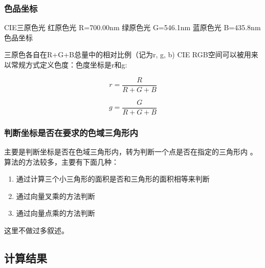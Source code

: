 \documentclass[UTF8]{article}
\begin{document}
\subsubsection{色品坐标}
CIE三原色光
红原色光    R=700.00nm
绿原色光    G=546.1nm
蓝原色光    B=435.8nm
色品坐标


三原色各自在R+G+B总量中的相对比例（记为r, g, b)
CIE RGB空间可以被用来以常规方式定义色度：色度坐标是r和g:


\begin{equation}
r= \frac{R}{R+G+B}
\end{equation}

\begin{equation}
g= \frac{G}{R+G+B}
\end{equation}

\subsubsection{判断坐标是否在要求的色域三角形内}
主要是判断坐标是否在色域三角形内，转为判断一个点是否在指定的三角形内
。算法的方法较多，主要有下面几种：
\begin{enumerate}
\item  通过计算三个小三角形的面积是否和三角形的面积相等来判断
\item  通过向量叉乘的方法判断
\item  通过向量点乘的方法判断
\end{enumerate}

这里不做过多叙述。

\subsection{计算结果}

\lstset{numbers=none,
  numberstyle=\scriptsize,
  frame=none,
  flexiblecolumns=false,
  language=,
  basicstyle=\ttfamily\tiny,
  breaklines=true,
  extendedchars=true,
  escapechar=~,
  texcl=true,
  showstringspaces=false,
  keywordstyle=\bfseries,
  xleftmargin=0em,
  xrightmargin=-6em,
  aboveskip=1em,
  tabsize=4}
\end{document}

